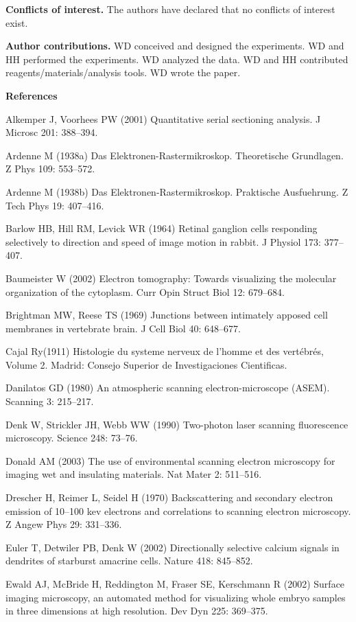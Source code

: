 \documentclass{article}
\begin{document}
\textbf{Conflicts of interest.} The authors have declared that no conflicts of interest exist.

\textbf{Author contributions.} WD conceived and designed the experiments. WD and HH performed the experiments. WD analyzed the data. WD and HH contributed reagents/materials/analysis tools. WD wrote the paper.

\noindent\textbf{References}\par
\begin{hangpars}
Alkemper J, Voorhees PW (2001) Quantitative serial sectioning analysis. J Microsc 201: 388–394.

Ardenne M (1938a) Das Elektronen-Rastermikroskop. Theoretische Grundlagen. Z Phys 109: 553–572.

Ardenne M (1938b) Das Elektronen-Rastermikroskop. Praktische Ausfuehrung. Z Tech Phys 19: 407–416.

Barlow HB, Hill RM, Levick WR (1964) Retinal ganglion cells responding selectively to direction and speed of image motion in rabbit. J Physiol 173: 377–407.

Baumeister W (2002) Electron tomography: Towards visualizing the molecular organization of the cytoplasm. Curr Opin Struct Biol 12: 679–684.

Brightman MW, Reese TS (1969) Junctions between intimately apposed cell membranes in vertebrate brain. J Cell Biol 40: 648–677.

Cajal Ry(1911) Histologie du systeme nerveux de l’homme et des vertébrés, Volume 2. Madrid: Consejo Superior de Investigaciones Cientificas.

Danilatos GD (1980) An atmospheric scanning electron-microscope (ASEM). Scanning 3: 215–217.

Denk W, Strickler JH, Webb WW (1990) Two-photon laser scanning fluorescence microscopy. Science 248: 73–76.

Donald AM (2003) The use of environmental scanning electron microscopy for imaging wet and insulating materials. Nat Mater 2: 511–516.

Drescher H, Reimer L, Seidel H (1970) Backscattering and secondary electron emission of 10–100 kev electrons and correlations to scanning electron microscopy. Z Angew Phys 29: 331–336.

Euler T, Detwiler PB, Denk W (2002) Directionally selective calcium signals in dendrites of starburst amacrine cells. Nature 418: 845–852.

Ewald AJ, McBride H, Reddington M, Fraser SE, Kerschmann R (2002) Surface imaging microscopy, an automated method for visualizing whole embryo samples in three dimensions at high resolution. Dev Dyn 225: 369–375.


\end{hangpars}
\end{document}
